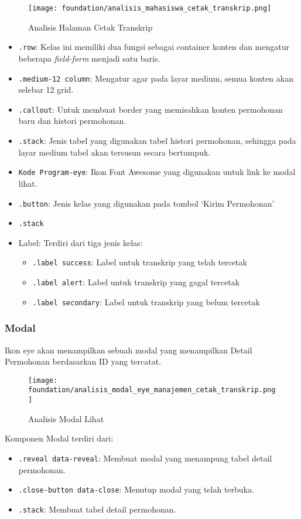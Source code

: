 \begin{figure} [H]
	\centering  
	\texttt{[image: foundation/analisis\_mahasiswa\_cetak\_transkrip.png]}
	\caption{Analisis Halaman Cetak Transkrip} 
\end{figure}
\begin{itemize}
	\item \texttt{.row}: Kelas ini memiliki dua fungsi sebagai container konten dan mengatur beberapa \textit{field-form} menjadi satu baris. 
	\item \texttt{.medium-12 column}: Mengatur agar pada layar medium, semua konten akan selebar 12 grid.
	\item \texttt{.callout}: Untuk membuat border yang memisahkan konten permohonan baru dan histori permohonan.
	\item \texttt{.stack}: Jenis tabel yang digunakan tabel histori permohonan, sehingga pada layar medium tabel akan tersusun secara bertumpuk.
	\item \texttt{Kode Program-eye}: Ikon Font Awesome yang digunakan untuk link ke modal lihat.
	\item \texttt{.button}: Jenis kelas yang digunakan pada tombol `Kirim Permohonan'
	\item \texttt{.stack}
	\item Label: Terdiri dari tiga jenis kelas:
	\begin{itemize}
		\item \texttt{.label success}: Label untuk transkrip yang telah tercetak
		\item \texttt{.label alert}: Label untuk transkrip yang gagal tercetak
		\item \texttt{.label secondary}: Label untuk transkrip yang belum tercetak
	\end{itemize}
	
\end{itemize}
\subsubsection{Modal}
Ikon eye akan menampilkan sebuah modal yang menampilkan Detail Permohonan berdasarkan ID yang tercatat.
\begin{figure} [H]
	\centering  
	\texttt{[image: foundation/analisis\_modal\_eye\_manajemen\_cetak\_transkrip.png]}  
	\caption{Analisis Modal Lihat} 
\end{figure}

Komponen Modal terdiri dari:
\begin{itemize}
	\item \texttt{.reveal data-reveal}: Membuat modal yang menampung tabel detail permohonan.
	\item \texttt{.close-button data-close}: Menutup modal yang telah terbuka.
	\item \texttt{.stack}:	Membuat tabel detail permohonan.
\end{itemize}
